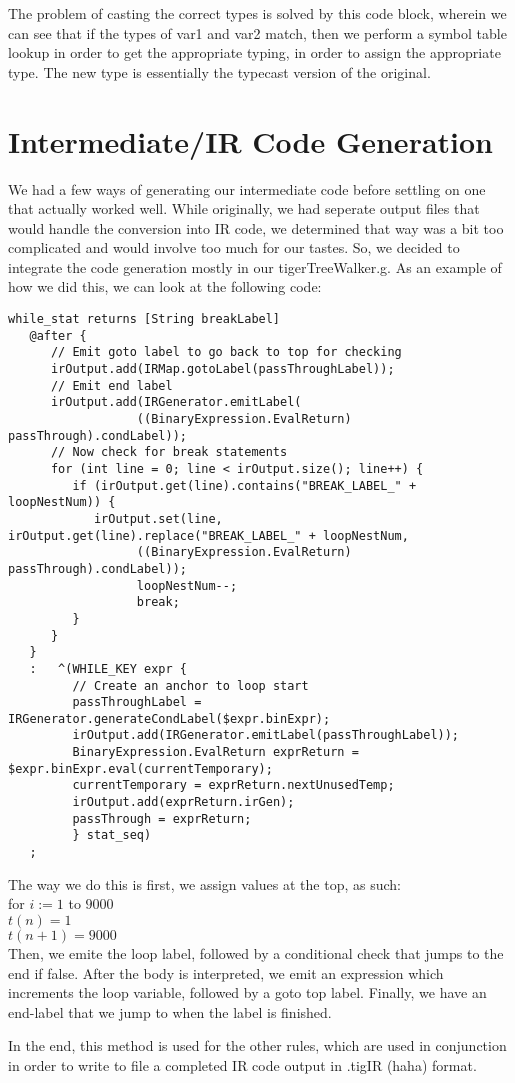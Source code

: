 \documentclass[a4paper]{article}
\begin{document}
The problem of casting the correct types is solved by this code block, wherein we can see that if the types of var1 and var2 match, then we perform a symbol table lookup in order to get the appropriate typing, in order to assign the appropriate type. The new type is essentially the typecast version of the original. 

\section{Intermediate/IR Code Generation}
We had a few ways of generating our intermediate code before settling on one that actually worked well. While originally, we had seperate output files that would handle the conversion into IR code, we determined that way was a bit too complicated and would involve too much for our tastes. So, we decided to integrate the code generation mostly in our tigerTreeWalker.g. As an example of how we did this, we can look at the following code:

\begin{verbatim}
while_stat returns [String breakLabel]
   @after {
      // Emit goto label to go back to top for checking
      irOutput.add(IRMap.gotoLabel(passThroughLabel));
      // Emit end label
      irOutput.add(IRGenerator.emitLabel(
                  ((BinaryExpression.EvalReturn) passThrough).condLabel));
      // Now check for break statements
      for (int line = 0; line < irOutput.size(); line++) {
         if (irOutput.get(line).contains("BREAK_LABEL_" + loopNestNum)) {
            irOutput.set(line, irOutput.get(line).replace("BREAK_LABEL_" + loopNestNum, 
                  ((BinaryExpression.EvalReturn) passThrough).condLabel));
                  loopNestNum--;
                  break;
         }
      }
   }
   :   ^(WHILE_KEY expr {
         // Create an anchor to loop start
         passThroughLabel = IRGenerator.generateCondLabel($expr.binExpr);
         irOutput.add(IRGenerator.emitLabel(passThroughLabel));
         BinaryExpression.EvalReturn exprReturn = $expr.binExpr.eval(currentTemporary);
         currentTemporary = exprReturn.nextUnusedTemp;  
         irOutput.add(exprReturn.irGen);
         passThrough = exprReturn;
         } stat_seq)
   ;
\end{verbatim}

The way we do this is first, we assign values at the top, as such:\\
for $ i := 1$ to $ 9000$\\
$t(n) = 1$\\
$t(n+1) = 9000$\\

Then, we emite the loop label, followed by a conditional check that jumps to the end if false. After the body is interpreted, we emit an expression which increments the loop variable, followed by a goto top label. Finally, we have an end-label that we jump to when the label is finished.

In the end, this method is used for the other rules, which are used in conjunction in order to write to file a completed IR code output in .tigIR (haha) format. 
\end{document}
